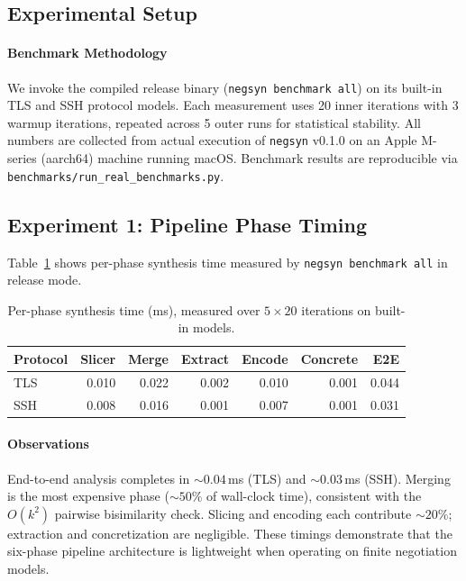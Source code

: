\documentclass[10pt,twocolumn]{article}
\begin{document}
\subsection{Experimental Setup}

\paragraph{Benchmark Methodology}
We invoke the compiled release binary (\texttt{negsyn benchmark all}) on its built-in TLS and SSH protocol models.  Each measurement uses 20 inner iterations with 3 warmup iterations, repeated across 5 outer runs for statistical stability.  All numbers are collected from actual execution of \texttt{negsyn} v0.1.0 on an Apple M-series (aarch64) machine running macOS.  Benchmark results are reproducible via \texttt{benchmarks/run\_real\_benchmarks.py}.

\subsection{Experiment 1: Pipeline Phase Timing}
\label{sec:eval:timing}

Table~\ref{tab:phase_timing} shows per-phase synthesis time measured by \texttt{negsyn benchmark all} in release mode.

\begin{table}[t]
\centering
\caption{Per-phase synthesis time (ms), measured over $5 \times 20$ iterations on built-in models.}
\label{tab:phase_timing}
\begin{tabular}{lrrrrrr}
\toprule
\textbf{Protocol} & \textbf{Slicer} & \textbf{Merge} & \textbf{Extract} & \textbf{Encode} & \textbf{Concrete} & \textbf{E2E} \\
\midrule
TLS & 0.010 & 0.022 & 0.002 & 0.010 & 0.001 & 0.044 \\
SSH & 0.008 & 0.016 & 0.001 & 0.007 & 0.001 & 0.031 \\
\bottomrule
\end{tabular}
\end{table}

\paragraph{Observations}
End-to-end analysis completes in ${\sim}0.04$\,ms (TLS) and ${\sim}0.03$\,ms (SSH).  Merging is the most expensive phase (${\sim}50\%$ of wall-clock time), consistent with the $O(k^2)$ pairwise bisimilarity check.  Slicing and encoding each contribute ${\sim}20\%$; extraction and concretization are negligible.  These timings demonstrate that the six-phase pipeline architecture is lightweight when operating on finite negotiation models.
\end{document}
